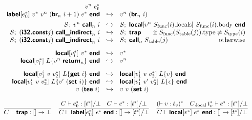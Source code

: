 \documentclass[a4paper]{scrartcl}
\newcommand\void[1]{}
\newcommand\f[1]{\ensuremath{\mathop{\mathrm{#1\null}}\nolimits}\xspace}
\newcommand\evalto{\hookrightarrow}
\newcommand\K[1]{\ensuremath{\textsf{#1}}}
\newcommand\KK[1]{\ensuremath{\K{\textbf{#1}}}}
\begin{document}
$$\begin{array}{rcl}
  v^n~e_0^\ast \\
\KK{label}[e_0^\ast]~v^\ast~v^n~(\KK{br}_n~i+1)~e^\ast~\KK{end} &\evalto&
  v^n~(\KK{br}_n~i) \\
[1ex]
S;~ v^n~\KK{call}_n~i &\evalto&
  S;~ \KK{local}[v^n~S_{\f{func}}(i).{\f{locals}}]~S_{\f{func}}(i).{\f{body}}~\KK{end} \\
S;~ (\KK{i32.const} j)~\KK{call\_indirect}_n~i &\evalto&
  S;~ \KK{trap}
  \hfill \text{if $S_{\f{func}}(S_{\f{table}}(j)).{\f{type}} \neq S_{\f{type}}(i)$} \\
S;~ (\KK{i32.const} j)~\KK{call\_indirect}_n~i &\evalto&
  S;~ \KK{call}_n~S_{\f{table}}(j)
  \hfill \text{otherwise} \\
[2ex]
\KK{local}[v_l^\ast]~v^\ast~\KK{end} &\evalto&
  v^\ast \\
\KK{local}[v_l^\ast]~L\{v^n~\KK{return}_n\}~\KK{end} &\evalto&
  v^n \\
[2ex]
\void{
S;~ (\KK{get}~i) &\evalto&
  S;~ S_{\f{local}}(i) \\
S;~ v~(\KK{set}~i) &\evalto&
  S,i=v;~ \epsilon \\
v~(\KK{tee}~i) &\evalto&
  v~v~(\KK{set}~i) \\
[1ex]
}
\KK{local}[v_1^i~v~v_2^\ast]~L\{\KK{get}~i\}~\KK{end} &\evalto&
  \KK{local}[v_1^i~v~v_2^\ast]~L\{v\}~\KK{end} \\
\KK{local}[v_1^i~v~v_2^\ast]~L\{v'~(\KK{set}~i)\}~\KK{end} &\evalto&
  \KK{local}[v_1^i~v'~v_2^\ast]~L\{\epsilon\}~\KK{end} \\
v~(\KK{tee}~i) &\evalto&
  v~v~(\KK{set}~i) \\
[1ex]
\end{array}
$$
%
$$
\frac{
}{
  C \vdash \KK{trap} : [] \to \poly{t^\ast}
}
\quad
\frac{
  C \vdash e_0^\ast : [t^\ast]\orbot
  \quad
  C \vdash e^\ast : [t^\ast]\orbot
}{
  C \vdash \KK{label}[e_0^\ast]~e^\ast~\KK{end} : [] \to [t^\ast]\orbot
}
\quad
\frac{
  (\vdash v : t_v)^\ast
  \quad
  C,_{\f{local}}t_v^\ast \vdash e^\ast : [t^\ast]\orbot
}{
  C \vdash \KK{local}[v^\ast]~e^\ast~\KK{end} : [] \to [t^\ast]\orbot
}
$$
\end{document}
